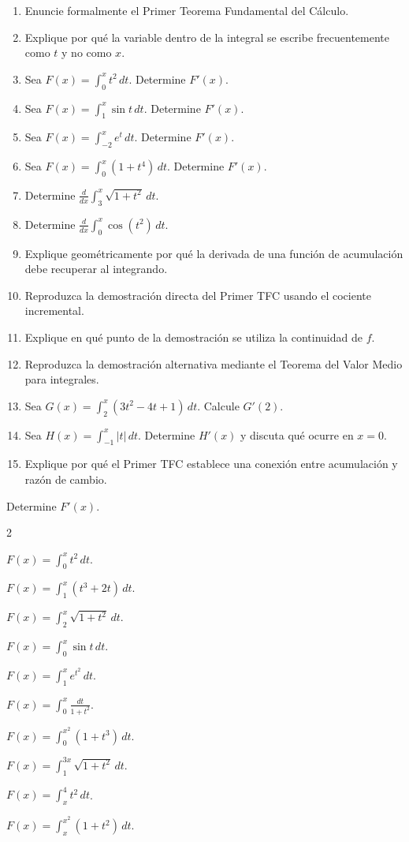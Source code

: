 \documentclass[12pt]{article}
\begin{document}
\begin{enumerate}[resume]
\item Enuncie formalmente el Primer Teorema Fundamental del Cálculo.
\item Explique por qué la variable dentro de la integral se escribe frecuentemente como $t$ y no como $x$.
\item Sea $F(x)=\int_0^x t^2\,dt$. Determine $F'(x)$.
\item Sea $F(x)=\int_1^x \sin t\,dt$. Determine $F'(x)$.
\item Sea $F(x)=\int_{-2}^x e^t\,dt$. Determine $F'(x)$.
\item Sea $F(x)=\int_0^x(1+t^4)\,dt$. Determine $F'(x)$.
\item Determine $\frac{d}{dx}\int_3^x\sqrt{1+t^2}\,dt$.
\item Determine $\frac{d}{dx}\int_0^x\cos(t^2)\,dt$.
\item Explique geométricamente por qué la derivada de una función de acumulación debe recuperar al integrando.
\item Reproduzca la demostración directa del Primer TFC usando el cociente incremental.
\item Explique en qué punto de la demostración se utiliza la continuidad de $f$.
\item Reproduzca la demostración alternativa mediante el Teorema del Valor Medio para integrales.
\item Sea $G(x)=\int_2^x(3t^2-4t+1)\,dt$. Calcule $G'(2)$.
\item Sea $H(x)=\int_{-1}^x |t|\,dt$. Determine $H'(x)$ y discuta qué ocurre en $x=0$.
\item Explique por qué el Primer TFC establece una conexión entre acumulación y razón de cambio.
\end{enumerate}

Determine $F'(x)$.

\begin{enumerate}[resume]
\begin{multicols}{2}
\item $\displaystyle F(x)=\int_0^x t^2\,dt$.
\item $\displaystyle F(x)=\int_1^x(t^3+2t)\,dt$.
\item $\displaystyle F(x)=\int_2^x\sqrt{1+t^2}\,dt$.
\item $\displaystyle F(x)=\int_0^x\sin t\,dt$.
\item $\displaystyle F(x)=\int_1^xe^{t^2}\,dt$.
\item $\displaystyle F(x)=\int_0^x\frac{dt}{1+t^2}$.
\item $\displaystyle F(x)=\int_0^{x^2}(1+t^3)\,dt$.
\item $\displaystyle F(x)=\int_1^{3x}\sqrt{1+t^2}\,dt$.
\item $\displaystyle F(x)=\int_x^4t^2\,dt$.
\item $\displaystyle F(x)=\int_x^{x^2}(1+t^2)\,dt$.
\end{multicols}
\end{enumerate}
\end{document}
